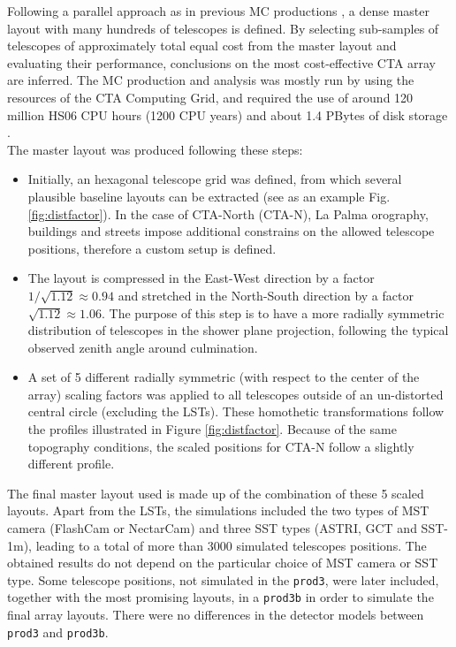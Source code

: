\documentclass{PoS}
\newcommand{\mcprod}[1]{\texttt{prod#1}}
\begin{document}
Following a parallel approach as in previous MC productions \cite{APP_CTA_MC, Hassan2017Apj}, a dense master layout with many hundreds of telescopes is defined. By selecting sub-samples of telescopes of approximately total equal cost from the master layout and evaluating their performance, conclusions on the most cost-effective CTA array are inferred. The MC production and analysis was mostly run by using the resources of the CTA Computing Grid, and required the use of around 120 million HS06 CPU hours (1200 CPU years) and about 1.4 PBytes of disk storage \cite{Arrabito-2015}.\\

The master layout was produced following these steps:

\begin{itemize}
    \item Initially, an hexagonal telescope grid was defined, from which several plausible baseline layouts can be extracted (see as an example Fig. \ref{fig:distfactor}). In the case of CTA-North (CTA-N), La Palma orography, buildings and streets impose additional constrains on the allowed telescope positions, therefore a custom setup is defined.
    \item The layout is compressed in the East-West direction by a factor $1/ \sqrt{1.12} \approx 0.94$ and stretched in the North-South direction by a factor $\sqrt{1.12} \approx 1.06$. The purpose of this step is to have a more radially symmetric distribution of telescopes in the shower plane projection, following the typical observed zenith angle around culmination.
    \item A set of 5 different radially symmetric (with respect to the center of the array) scaling factors was applied to all telescopes outside of an un-distorted central circle (excluding the LSTs). These homothetic transformations follow the profiles illustrated in Figure \ref{fig:distfactor}. Because of the same topography conditions, the scaled positions for CTA-N follow a slightly different profile.
\end{itemize}

The final master layout used is made up of the combination of these 5 scaled layouts. Apart from the LSTs, the simulations included the two types of MST camera (FlashCam or NectarCam) and three SST types (ASTRI, GCT and SST-1m), leading to a total of more than 3000 simulated telescopes positions. The obtained results do not depend on the particular choice of MST camera or SST type. Some telescope positions, not simulated in the \mcprod{3}, were later included, together with the most promising layouts, in a \mcprod{3b} in order to simulate the final array layouts. There were no differences in the detector models between \mcprod{3} and \mcprod{3b}.
\end{document}

